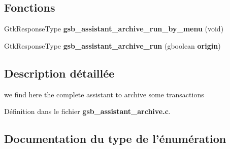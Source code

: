 \subsection*{Fonctions}
\begin{DoxyCompactItemize}
\item 
GtkResponseType {\bf gsb\_\-assistant\_\-archive\_\-run\_\-by\_\-menu} (void)
\item 
GtkResponseType {\bf gsb\_\-assistant\_\-archive\_\-run} (gboolean {\bf origin})
\end{DoxyCompactItemize}


\subsection{Description détaillée}
we find here the complete assistant to archive some transactions 

Définition dans le fichier {\bf gsb\_\-assistant\_\-archive.c}.



\subsection{Documentation du type de l'énumération}
